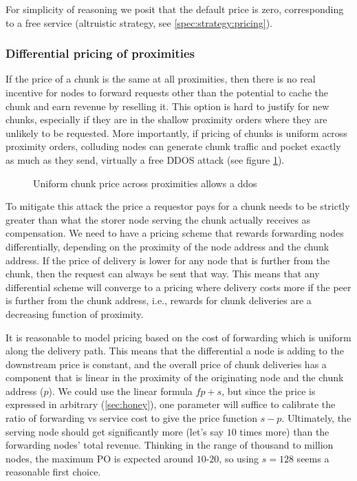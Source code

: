 For simplicity of reasoning we posit that the default price is zero, corresponding to a free service (altruistic strategy, see \ref{spec:strategy:pricing}). 

\subsubsection{Differential pricing of proximities}

If the price of a chunk is the same at all proximities, then there is no real incentive for nodes to forward requests other than the potential to cache the chunk and earn revenue by reselling it. This option is hard to justify for new chunks, especially if they are in the shallow proximity orders where they are unlikely to be requested. More importantly, if pricing of chunks is uniform across proximity orders, colluding nodes can generate chunk traffic  and pocket exactly as much as they send, virtually a free DDOS attack (see figure \ref{fig:ddos-uniform-price}).

\begin{figure}[htbp]
   \centering
   \caption[Uniform chunk price across proximities allows a ddos]{Uniform chunk price across proximities allows a ddos}
   \label{fig:ddos-uniform-price}
\end{figure}

To mitigate this attack the price a requestor pays for a chunk needs to be strictly greater than what the storer node serving the chunk actually receives as compensation. We need to have a pricing scheme that rewards forwarding nodes differentially, depending on the proximity of  the node address and the chunk address. If the price of delivery is lower for any node that is further from the chunk, then the request can always be sent that way. This means that any differential scheme will converge to a pricing where delivery costs more if the peer is further from the chunk address, i.e., rewards for chunk deliveries are a decreasing function of proximity. 

It is reasonable to model pricing based on the cost of forwarding which is uniform along the delivery path. This means that the differential a node is adding to the downstream price is constant, and the overall price of chunk deliveries has a component that is linear in the proximity of the originating node and the chunk address ($p$). We could use the linear formula $fp+s$, but since the price is expressed in arbitrary  (\ref{sec:honey}), one parameter will suffice to calibrate the ratio of forwarding vs service cost to give the price  function $s-p$. Ultimately, the serving node should get significantly more (let's say $10$ times more) than the forwarding nodes' total revenue. Thinking in the range of thousand to million nodes, the maximum PO is expected  around $10$-$20$, so using $s=128$ seems a reasonable first choice. 

